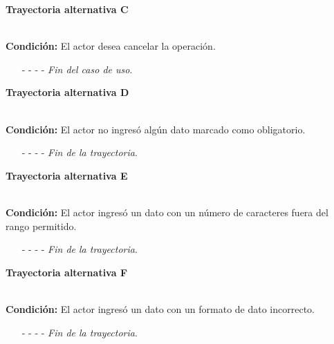 \hypertarget{CU2-1:TAC}{\textbf{Trayectoria alternativa C}}\\
\noindent \textbf{Condición:} El actor desea cancelar la operación.
\begin{enumerate}
	\UCpaso[\UCactor] Solicita cancelar la operación oprimiendo el botón  de la pantalla 
	\UCpaso[\UCsist] Muestra la pantalla .
	\item[- -] - - {\em {Fin del caso de uso}}.%
\end{enumerate}
\hypertarget{CU2-1:TAD}{\textbf{Trayectoria alternativa D}}\\
\noindent \textbf{Condición:} El actor no ingresó algún dato marcado como obligatorio.
\begin{enumerate}
	\UCpaso[\UCsist] Muestra el mensaje  señalando el campo que presenta el error en la pantalla .
	\UCpaso Regresa al paso \ref{CU2.1-P5} de la trayectoria principal.
	\item[- -] - - {\em {Fin de la trayectoria}}.%
\end{enumerate}
\hypertarget{CU2-1:TAE}{\textbf{Trayectoria alternativa E}}\\
\noindent \textbf{Condición:} El actor ingresó un dato con un número de caracteres fuera del rango permitido.
\begin{enumerate}
	\UCpaso[\UCsist] Muestra el mensaje  señalando el campo que presenta el error en la pantalla .
	\UCpaso Regresa al paso \ref{CU2.1-P5} de la trayectoria principal.
	\item[- -] - - {\em {Fin de la trayectoria}}.%
\end{enumerate}
\hypertarget{CU2-1:TAF}{\textbf{Trayectoria alternativa F}}\\
\noindent \textbf{Condición:} El actor ingresó un dato con un formato de dato incorrecto.
\begin{enumerate}
	\UCpaso[\UCsist] Muestra el mensaje  señalando el campo que presenta el error en la pantalla .
	\UCpaso Regresa al paso \ref{CU2.1-P5} de la trayectoria principal.
	\item[- -] - - {\em {Fin de la trayectoria}}.
\end{enumerate}
